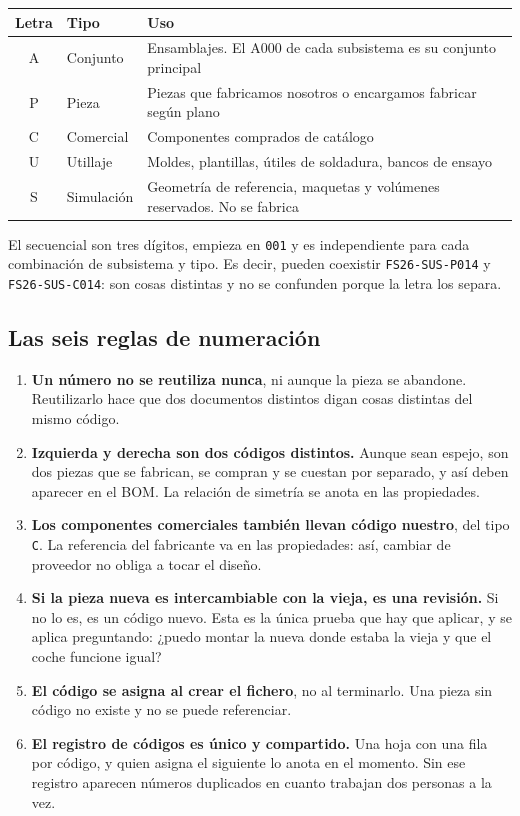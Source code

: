 \begin{center}
\begin{tabularx}{\textwidth}{@{}clX@{}}
\toprule
\textbf{Letra} & \textbf{Tipo} & \textbf{Uso} \\
\midrule
\ttfamily A & Conjunto & Ensamblajes. El \ttfamily A000 \normalfont de cada subsistema es su conjunto principal \\
\ttfamily P & Pieza    & Piezas que fabricamos nosotros o encargamos fabricar según plano \\
\ttfamily C & Comercial & Componentes comprados de catálogo \\
\ttfamily U & Utillaje & Moldes, plantillas, útiles de soldadura, bancos de ensayo \\
\ttfamily S & Simulación & Geometría de referencia, maquetas y volúmenes reservados. No se fabrica \\
\bottomrule
\end{tabularx}
\end{center}

El secuencial son tres dígitos, empieza en \texttt{001} y es independiente para
cada combinación de subsistema y tipo. Es decir, pueden coexistir
\texttt{FS26-SUS-P014} y \texttt{FS26-SUS-C014}: son cosas distintas y no se
confunden porque la letra los separa.

\subsection{Las seis reglas de numeración}

\begin{enumerate}
  \item \textbf{Un número no se reutiliza nunca}, ni aunque la pieza se abandone.
        Reutilizarlo hace que dos documentos distintos digan cosas distintas del
        mismo código.
  \item \textbf{Izquierda y derecha son dos códigos distintos.} Aunque sean
        espejo, son dos piezas que se fabrican, se compran y se cuestan por
        separado, y así deben aparecer en el BOM. La relación de simetría se anota
        en las propiedades.
  \item \textbf{Los componentes comerciales también llevan código nuestro}, del
        tipo \texttt{C}. La referencia del fabricante va en las propiedades: así,
        cambiar de proveedor no obliga a tocar el diseño.
  \item \textbf{Si la pieza nueva es intercambiable con la vieja, es una
        revisión.} Si no lo es, es un código nuevo. Esta es la única prueba que
        hay que aplicar, y se aplica preguntando: ¿puedo montar la nueva donde
        estaba la vieja y que el coche funcione igual?
  \item \textbf{El código se asigna al crear el fichero}, no al terminarlo. Una
        pieza sin código no existe y no se puede referenciar.
  \item \textbf{El registro de códigos es único y compartido.} Una hoja con una
        fila por código, y quien asigna el siguiente lo anota en el momento. Sin
        ese registro aparecen números duplicados en cuanto trabajan dos personas
        a la vez.
\end{enumerate}

